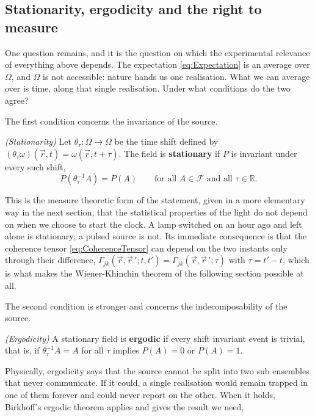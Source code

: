 	\subsection{Stationarity, ergodicity and the right to measure}

		One question remains, and it is the question on which the experimental relevance of
		everything above depends. The expectation \eqref{eq:Expectation} is an average over
		$\Omega$, and $\Omega$ is not accessible: nature hands us one realisation. What we can
		average over is time, along that single realisation. Under what conditions do the two
		agree?

		The first condition concerns the invariance of the source.

		\begin{myDef}
			\textit{(Stationarity)} Let $\theta_{\tau}:\Omega\to\Omega$ be the time shift
			defined by $(\theta_{\tau}\omega)(\vec{r},t) = \omega(\vec{r},t+\tau)$. The field is
			\textbf{stationary} if $P$ is invariant under every such shift,
			\begin{equation}\label{eq:StationarityMeasure}
				P\left(\theta_{\tau}^{-1}A\right) = P(A) \qquad \text{for all } A\in\mathcal{F} \text{ and all } \tau\in\mathbb{R}.
			\end{equation}
		\end{myDef}

		This is the measure theoretic form of the statement, given in a more elementary way in
		the next section, that the statistical properties of the light do not depend on when we
		choose to start the clock. A lamp switched on an hour ago and left alone is stationary; a
		pulsed source is not. Its immediate consequence is that the coherence tensor
		\eqref{eq:CoherenceTensor} can depend on the two instants only through their difference,
		$\Gamma_{jk}(\vec{r},\vec{r}\,';t,t') = \Gamma_{jk}(\vec{r},\vec{r}\,';\tau)$ with
		$\tau=t'-t$, which is what makes the Wiener-Khinchin theorem of the following section
		possible at all.

		The second condition is stronger and concerns the indecomposability of the source.

		\begin{myDef}
			\textit{(Ergodicity)} A stationary field is \textbf{ergodic} if every shift
			invariant event is trivial, that is, if $\theta_{\tau}^{-1}A = A$ for all $\tau$
			implies $P(A)=0$ or $P(A)=1$.
		\end{myDef}

		Physically, ergodicity says that the source cannot be split into two sub ensembles that
		never communicate. If it could, a single realisation would remain trapped in one of them
		forever and could never report on the other. When it holds, Birkhoff's ergodic theorem
		\citep{birkhoff1931proof} applies and gives the result we need,

